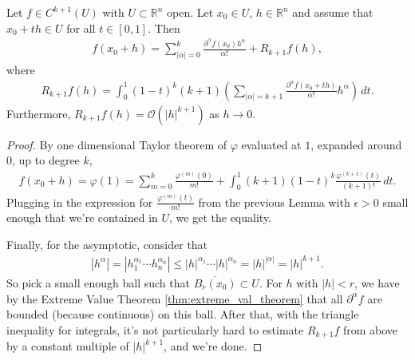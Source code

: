 \begin{theorem}\label{thm:taylor}
    Let $f \in C^{k+1}(U)$ with $U \subset \mathbb{R}^{n}$ open. Let $x_{0} \in U$, $h \in \mathbb{R}^{n}$ and assume that $x_{0}+th \in U$ for all $t \in [0,1]$. Then
    \begin{align*}
        f(x_{0} + h) = \sum_{\left| \alpha  \right| = 0}^{k} \frac{\partial^{\alpha }f(x_{0}) h^{\alpha }}{\alpha !} + R_{k+1}f(h), 
    \end{align*}
    where 
    \begin{align*}
        R_{k+1}f(h) = \int_{0}^{1} (1-t)^{k}(k+1) \left( \sum_{\left| \alpha  \right| = k+1} \frac{\partial^{\alpha }f(x_{0}+th)}{\alpha !} h^{\alpha }\right)   \, dt.
    \end{align*}
    Furthermore, $R_{k+1}f(h) = \mathcal{O}(\left| h \right|^{k+1})$ as $h \to 0$.
\end{theorem}
\begin{proof}
    By one dimensional Taylor theorem of $\varphi$ evaluated at $1$, expanded around $0$, up to degree $k$,
    \begin{align*}
        f(x_{0} + h) = \varphi(1) = \sum_{m=0}^{k} \frac{\varphi^{(m)}(0)}{m!} + \int_{0}^{1} (k+1)(1-t)^{k} \frac{\varphi^{(k+1)}(t)}{(k+1)!} \, dt.
    \end{align*}
    Plugging in the expression for $\frac{\varphi^{(m)}(t)}{m!}$ from the previous Lemma with $\epsilon > 0$ small enough that we're contained in $U$, we get the equality.

    Finally, for the asymptotic, consider that
    \begin{align*}
        \left| h^{\alpha } \right| = \left| h_{1}^{\alpha_{1}} \cdots h_{n}^{\alpha_{n}} \right| \leq \left| h \right|^{\alpha_{1}} \cdots \left| h \right|^{\alpha_{n}} = \left| h \right|^{\left| \alpha  \right|} = \left| h \right|^{k+1}.
    \end{align*}
    So pick a small enough ball such that $\overline{ B_{r}(x_{0}) } \subset U$. For $h$ with $\left| h \right| < r$, we have by the Extreme Value Theorem \ref{thm:extreme_val_theorem} that all $\partial^{\alpha }f$ are bounded (because continuous) on this ball. After that, with the triangle inequality for integrals, it's not particularly hard to estimate $R_{k+1}f$ from above by a constant multiple of $\left| h \right|^{k+1}$, and we're done. 
\end{proof}

